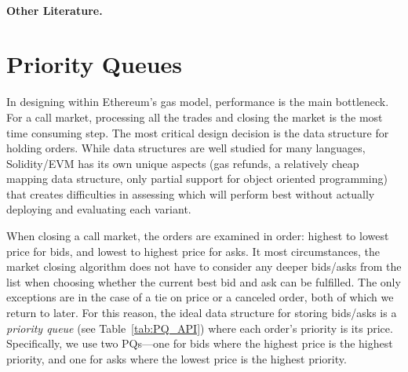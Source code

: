 \paragraph{Other Literature.}


\section{Priority Queues}\label{sec:pq}



In designing \cm within Ethereum's gas model, performance is the main bottleneck. For a call market, processing all the trades and closing the market is the most time consuming step. The most critical design decision is the data structure for holding orders. While data structures are well studied for many languages, Solidity/EVM has its own unique aspects (\eg gas refunds, a relatively cheap mapping data structure, only partial support for object oriented programming) that creates difficulties in assessing which will perform best without actually deploying and evaluating each variant. 

When closing a call market, the orders are examined in order: highest to lowest price for bids, and lowest to highest price for asks. It most circumstances, the market closing algorithm does not have to consider any deeper bids/asks from the list when choosing whether the current best bid and ask can be fulfilled. The only exceptions are in the case of a tie on price or a canceled order, both of which we return to later. For this reason, the ideal data structure for storing bids/asks is a \textit{priority queue} (see Table~\ref{tab:PQ_API}) where each order's priority is its price. Specifically, we use two PQs---one for bids where the highest price is the highest priority, and one for asks where the lowest price is the highest priority. 

